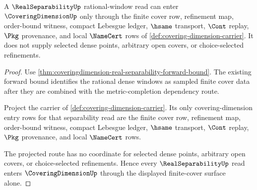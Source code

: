 \begin{theorem}
\label{thm:real-separability-covering-dimension-forward-route}
A $\RealSeparabilityUp$ rational-window read can enter $\CoveringDimensionUp$ only through the finite cover row, refinement map, order-bound witness, compact Lebesgue ledger, $\hsame$ transport, $\Cont$ replay, $\Pkg$ provenance, and local $\NameCert$ rows of \autoref{def:covering-dimension-carrier}. It does not supply selected dense points, arbitrary open covers, or choice-selected refinements.
\end{theorem}
\begin{proof}
Use \autoref{thm:coveringdimension-real-separability-forward-bound}. The existing forward bound identifies the rational dense windows as sampled finite cover data after they are combined with the metric-completion dependency route.

Project the carrier of \autoref{def:covering-dimension-carrier}. Its only covering-dimension entry rows for that separability read are the finite cover row, refinement map, order-bound witness, compact Lebesgue ledger, $\hsame$ transport, $\Cont$ replay, $\Pkg$ provenance, and local $\NameCert$ rows.

The projected route has no coordinate for selected dense points, arbitrary open covers, or choice-selected refinements. Hence every $\RealSeparabilityUp$ read enters $\CoveringDimensionUp$ through the displayed finite-cover surface alone.
\end{proof}
